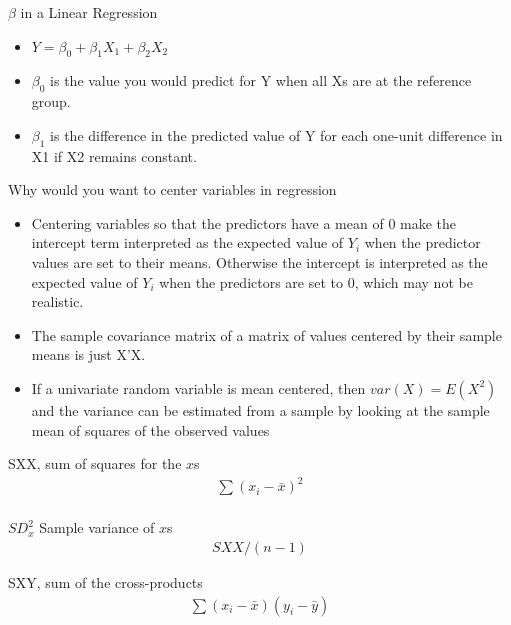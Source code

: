 \documentclass[avery5388,grid,frame]{flashcards}
\begin{document}
\begin{flashcard}[Interpretation]{$\beta$ in a Linear Regression}
\bigskip\bigskip
\begin{itemize}
\item $Y=\beta_0+\beta_1X_1+\beta_2X_2$\\
\item $\beta_0$ is the value you would predict for Y when all Xs are at the reference group.\\
\item $\beta_1$ is the difference in the predicted value of Y for each one-unit difference in X1 if X2 remains constant.
\end{itemize}
\end{flashcard}
\begin{flashcard}{Why would you want to center variables in regression}
\bigskip\bigskip
\begin{itemize}
\item Centering variables so that the predictors have a mean of 0 make the intercept term interpreted as the expected value of $Y_i$ when the predictor values are set to their means. Otherwise the intercept is interpreted as the expected value of $Y_i$ when the predictors are set to 0, which may not be realistic. 
\item The sample covariance matrix of a matrix of values centered by their sample means is just X'X. 
\item If a univariate random variable is mean centered, then $var(X)=E(X^2)$ and the variance can be estimated from a sample by looking at the sample mean of squares of the observed values
\end{itemize}
\end{flashcard}
\begin{flashcard}[Equation]{SXX, sum of squares for the $x$s}
\bigskip\bigskip\bigskip
{\begin{align*}
\sum(x_i-\bar{x})^2\\
\end{align*}}
\end{flashcard}
\begin{flashcard}[Equation]{$SD_x^2$ Sample variance of $x$s}
\bigskip\bigskip\bigskip
{\begin{align*}
SXX/(n-1)
\end{align*}}
\end{flashcard}
\begin{flashcard}[Equation]{SXY, sum of the cross-products}
\bigskip\bigskip\bigskip
{\begin{align*}
\sum(x_i-\bar{x})(y_i-\bar{y})
\end{align*}}
\end{flashcard}
\end{document}
